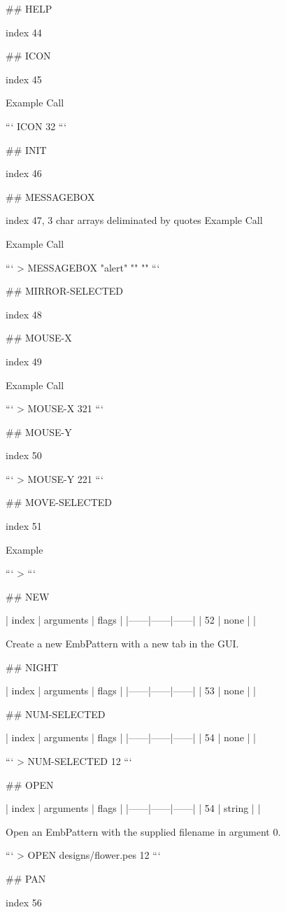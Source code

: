 ## HELP

index 44



## ICON

index 45

Example Call

```
ICON 32
```

## INIT

index 46



## MESSAGEBOX

index 47, 3 char arrays deliminated by quotes Example Call

Example Call

```
> MESSAGEBOX "alert" "" ""
```

## MIRROR-SELECTED

index 48

## MOUSE-X

index 49

Example Call

```
> MOUSE-X
321
```

## MOUSE-Y

index 50

```
> MOUSE-Y
221
```

## MOVE-SELECTED

index 51

Example

```
> 
```

## NEW

| index | arguments | flags |
|------|------|------|
| 52 | none | |

Create a new EmbPattern with a new tab in the GUI.

## NIGHT

| index | arguments | flags |
|------|------|------|
| 53 | none | |



## NUM-SELECTED

| index | arguments | flags |
|------|------|------|
| 54 | none | |

```
> NUM-SELECTED
12
```

## OPEN

| index | arguments | flags |
|------|------|------|
| 54 | string | |

Open an EmbPattern with the supplied filename in argument 0.

```
> OPEN designs/flower.pes
12
```

## PAN

index 56



